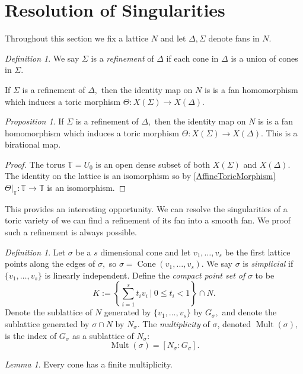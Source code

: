 \documentclass[BSc]{usydthesis}
\numberwithin{equation}{chapter}
\theoremstyle{remark}
\newtheorem{Definition}[equation]{Definition}
\newtheorem{Proposition}[equation]{Proposition}
\newtheorem{Lemma}[equation]{Lemma}
\newcommand{\T}{\mathbb{T}}
\newcommand{\M}{\operatorname{Mult}}
\DeclareMathOperator{\Cone}{Cone}
\begin{document}
\section{Resolution of Singularities}

Throughout this section we fix a lattice $N$ and let $\Delta, \Sigma$ denote fans in $N.$ 

\begin{Definition}
We say $\Sigma$ is a {\em refinement} of $\Delta$ if each cone in $\Delta$ is a union of cones in $\Sigma.$
\end{Definition}

If $\Sigma$ is a refinement of $\Delta,$ then the identity map on $N$ is is a fan homomorphism which induces a toric morphism $\Theta: X(\Sigma) \to X(\Delta).$

\begin{Proposition}
If $\Sigma$ is a refinement of $\Delta,$ then the identity map on $N$ is is a fan homomorphism which induces a toric morphism $\Theta: X(\Sigma) \to X(\Delta).$ This is a birational map. 
\end{Proposition}
\begin{proof}
 The torus $\T = U_0$ is an open dense subset of both $X(\Sigma)$ and $X(\Delta).$ The identity on the lattice is an isomorphism so by \ref{AffineToricMorphism} $\Theta|_{\T}:\T \to \T$ is an isomorphism.
\end{proof}
This provides an interesting opportunity. We can resolve the singularities of a toric variety of we can find a refinement of its fan into a smooth fan. We proof such a refinement is always possible. 
\begin{Definition}
 Let $\sigma$ be a $s$ dimensional cone and let $v_1,\ldots, v_s$ be the first lattice points along the edges of $\sigma,$ so $\sigma = \Cone(v_1,\ldots, v_s).$ We say $\sigma$ is {\em simplicial} if $\{v_1,\ldots, v_s\}$ is linearly independent. Define the {\em compact point set of} $\sigma$ to be $$K:= \left\{ \sum_{i=1}^s t_i v_i \ \bigg| \ 0\leq t_i < 1 \right\} \cap N.$$ Denote the sublattice of $N$ generated by $\{v_1,\ldots, v_s\}$ by $G_{\sigma},$ and denote the sublattice generated by $\sigma \cap N$ by $N_{\sigma}.$ The {\em multiplicity} of $\sigma$, denoted $\M(\sigma),$ is the index of $G_{\sigma}$ as a sublattice of $N_{\sigma}:$ $$\M(\sigma) = [ N_{\sigma} : G_{\sigma}].$$
\end{Definition}
\begin{Lemma} Every cone has a finite multiplicity.
\end{Lemma}
\end{document}
